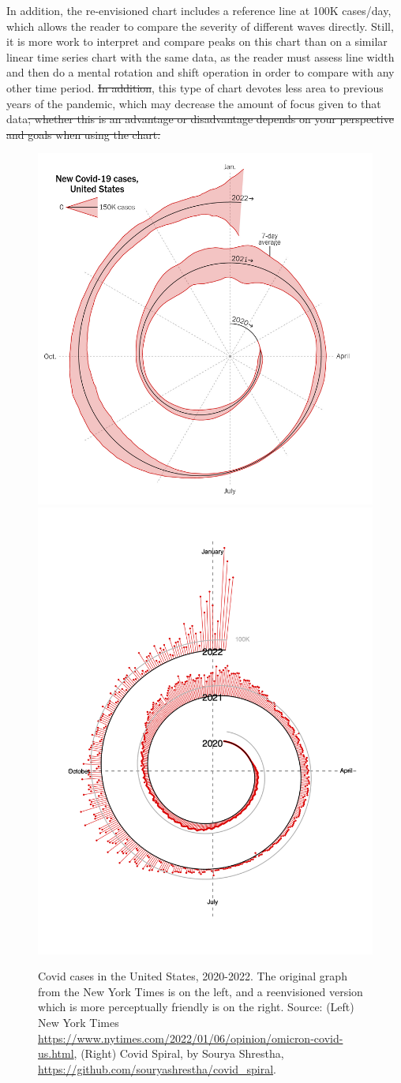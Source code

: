 \documentclass[article]{jdssv}\usepackage[]{graphicx}\usepackage[]{xcolor} %
\providecommand{\DIFadd}[1]{{\protect\color{blue}\uwave{#1}}} %
\providecommand{\DIFdel}[1]{{\protect\color{red}\sout{#1}}}                      %
\providecommand{\DIFaddbegin}{} %
\providecommand{\DIFaddend}{} %
\providecommand{\DIFdelbegin}{} %
\providecommand{\DIFdelend}{} %
\newcommand{\DIFscaledelfig}{0.5}
\newlength{\DIFdelgraphicswidth} %
\newlength{\DIFdelgraphicsheight} %
\newcommand{\DIFaddincludegraphics}[2][]{{\color{blue}\fbox{\DIFOincludegraphics[#1]{#2}}}} %
\newcommand{\DIFdelincludegraphics}[2][]{%
\sbox{\DIFdelgraphicsbox}{\DIFOincludegraphics[#1]{#2}}%
\settoboxwidth{\DIFdelgraphicswidth}{\DIFdelgraphicsbox} %
\settoboxtotalheight{\DIFdelgraphicsheight}{\DIFdelgraphicsbox} %
\scalebox{\DIFscaledelfig}{%
\parbox[b]{\DIFdelgraphicswidth}{\usebox{\DIFdelgraphicsbox}\\[-\baselineskip] \rule{\DIFdelgraphicswidth}{0em}}\llap{\resizebox{\DIFdelgraphicswidth}{\DIFdelgraphicsheight}{%
\setlength{\unitlength}{\DIFdelgraphicswidth}%
\begin{picture}(1,1)%
\thicklines\linethickness{2pt} %
{\color[rgb]{1,0,0}\put(0,0){\framebox(1,1){}}}%
{\color[rgb]{1,0,0}\put(0,0){\line( 1,1){1}}}%
{\color[rgb]{1,0,0}\put(0,1){\line(1,-1){1}}}%
\end{picture}%
}\hspace*{3pt}}} %
} %
\DeclareRobustCommand{\DIFaddbegin}{\DIFOaddbegin \let\includegraphics\DIFaddincludegraphics} %
\DeclareRobustCommand{\DIFaddend}{\DIFOaddend \let\includegraphics\DIFOincludegraphics} %
\DeclareRobustCommand{\DIFdelbegin}{\DIFOdelbegin \let\includegraphics\DIFdelincludegraphics} %
\DeclareRobustCommand{\DIFdelend}{\DIFOaddend \let\includegraphics\DIFOincludegraphics} %
\begin{document}
\DIFaddend In addition, the re-envisioned chart includes a reference line at 100K cases/day, which allows the reader to compare the severity of different waves directly. Still, it is more work to interpret and compare peaks on this chart than on a similar linear time series chart with the same data, as the reader must assess line width and then do a mental rotation and shift operation in order to compare with any other time period. \DIFdelbegin \DIFdel{In addition}\DIFdelend \DIFaddbegin \DIFadd{By design}\DIFaddend , this type of chart devotes less area to previous years of the pandemic, which may decrease the amount of focus given to that data\DIFdelbegin \DIFdel{; whether this is an advantage or disadvantage depends on your perspective and goals when using the chart.}\DIFdelend \DIFaddbegin \DIFadd{.%
}\DIFaddend 

\begin{figure}\centering
\includegraphics[width=.45\linewidth]{nyt-spiral}\hfill\includegraphics[width=.45\linewidth]{spiral-rework}
\caption{Covid cases in the United States, 2020-2022. The original graph from the New York Times is on the left, and a reenvisioned version which is more perceptually friendly is on the right. Source: (Left) New York Times \url{https://www.nytimes.com/2022/01/06/opinion/omicron-covid-us.html}, (Right) Covid Spiral, by Sourya Shrestha, \url{https://github.com/souryashrestha/covid_spiral}.}
\label{fig:nyt-spiral}
\end{figure}
\end{document}

